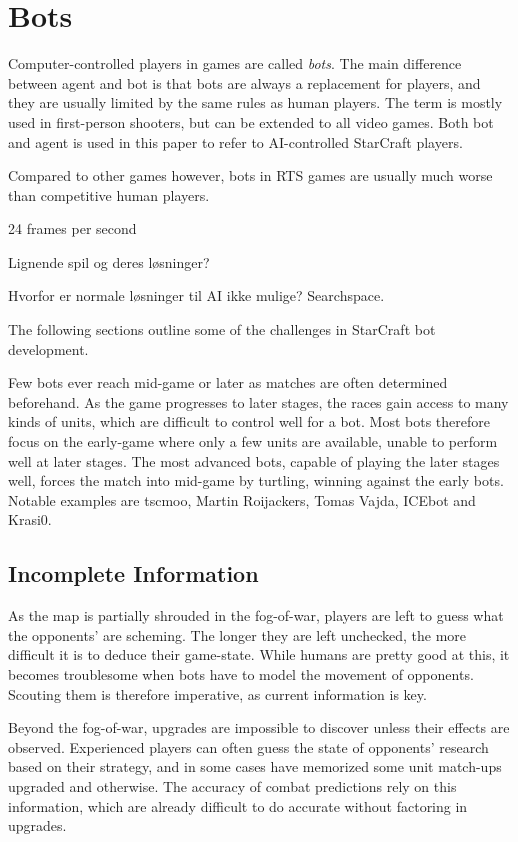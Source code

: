 \section{Bots}
Computer-controlled players in games are called \emph{bots}. The main difference between agent and bot is that bots are always a replacement for players, and they are usually limited by the same rules as human players. The term is mostly used in first-person shooters, but can be extended to all video games. Both bot and agent is used in this paper to refer to AI-controlled StarCraft players.

Compared to other games however, bots in RTS games are usually much worse than competitive human players.

24 frames per second

Lignende spil og deres løsninger?

Hvorfor er normale løsninger til AI ikke mulige? Searchspace.

The following sections outline some of the challenges in StarCraft bot development.

Few bots ever reach mid-game or later as matches are often determined beforehand. As the game progresses to later stages, the races gain access to many kinds of units, which are difficult to control well for a bot. Most bots therefore focus on the early-game where only a few units are available, unable to perform well at later stages. The most advanced bots, capable of playing the later stages well, forces the match into mid-game by turtling, winning against the early bots. Notable examples are tscmoo, Martin Roijackers, Tomas Vajda, ICEbot and Krasi0.

	\subsection*{Incomplete Information}
	As the map is partially shrouded in the fog-of-war, players are left to guess what the opponents' are scheming. The longer they are left unchecked, the more difficult it is to deduce their game-state. While humans are pretty good at this, it becomes troublesome when bots have to model the movement of opponents. Scouting them is therefore imperative, as current information is key.
	
	Beyond the fog-of-war, upgrades are impossible to discover unless their effects are observed. Experienced players can often guess the state of opponents' research based on their strategy, and in some cases have memorized some unit match-ups upgraded and otherwise. The accuracy of combat predictions rely on this information, which are already difficult to do accurate without factoring in upgrades.
	
